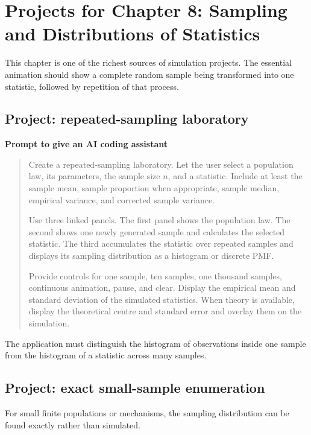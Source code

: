 \section{Projects for Chapter 8: Sampling and Distributions of Statistics}

This chapter is one of the richest sources of simulation projects. The essential animation should show a complete random sample being transformed into one statistic, followed by repetition of that process.

\subsection*{Project: repeated-sampling laboratory}

\begin{examplebox}
\textbf{Prompt to give an AI coding assistant}

\begin{quote}\small
Create a repeated-sampling laboratory. Let the user select a population law, its parameters, the sample size \(n\), and a statistic. Include at least the sample mean, sample proportion when appropriate, sample median, empirical variance, and corrected sample variance.

Use three linked panels. The first panel shows the population law. The second shows one newly generated sample and calculates the selected statistic. The third accumulates the statistic over repeated samples and displays its sampling distribution as a histogram or discrete PMF.

Provide controls for one sample, ten samples, one thousand samples, continuous animation, pause, and clear. Display the empirical mean and standard deviation of the simulated statistics. When theory is available, display the theoretical centre and standard error and overlay them on the simulation.
\end{quote}
\end{examplebox}

The application must distinguish the histogram of observations inside one sample from the histogram of a statistic across many samples.

\subsection*{Project: exact small-sample enumeration}

For small finite populations or mechanisms, the sampling distribution can be found exactly rather than simulated.

